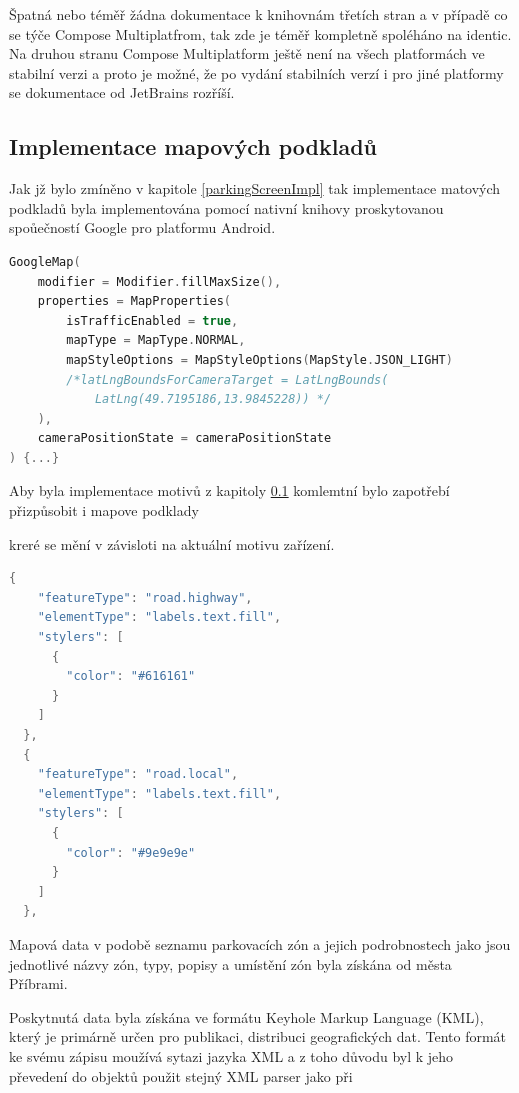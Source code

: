 Špatná nebo téměř žádna dokumentace k knihovnám třetích stran a v případě co se týče Compose Multiplatfrom, tak zde je téměř kompletně spoléháno na
identic. 
Na druhou stranu Compose Multiplatform ještě není na všech platformách ve stabilní verzi a proto je možné, že po vydání stabilních verzí i pro jiné
platformy se dokumentace od JetBrains rozříší.


\subsection{Implementace mapových podkladů}

Jak jž bylo zmíněno v kapitole \ref{parkingScreenImpl} tak implementace matových podkladů byla implementována pomocí nativní knihovy proskytovanou
spoůečností Google pro platformu Android. 

\begin{lstlisting}[caption={GoogleMap element}, label={lst:GoogleMapview}, language=kotlin]
  GoogleMap(
    modifier = Modifier.fillMaxSize(),
    properties = MapProperties(
        isTrafficEnabled = true,
        mapType = MapType.NORMAL,
        mapStyleOptions = MapStyleOptions(MapStyle.JSON_LIGHT)
        /*latLngBoundsForCameraTarget = LatLngBounds(
            LatLng(49.7195186,13.9845228)) */
    ),
    cameraPositionState = cameraPositionState
) {...}
\end{lstlisting}


Aby byla implementace motivů z kapitoly \ref{} komlemtní bylo zapotřebí přizpůsobit i mapove podklady

kreré se mění v závisloti na aktuální motivu zařízení.

\begin{lstlisting}[caption={Motiv mapy ve formátu JSON}, label={lst:MapStyle}, language=kotlin]
  {
    "featureType": "road.highway",
    "elementType": "labels.text.fill",
    "stylers": [
      {
        "color": "#616161"
      }
    ]
  },
  {
    "featureType": "road.local",
    "elementType": "labels.text.fill",
    "stylers": [
      {
        "color": "#9e9e9e"
      }
    ]
  },
\end{lstlisting}


Mapová data v podobě seznamu parkovacích zón a jejich podrobnostech jako jsou jednotlivé názvy zón, typy, popisy a umístění zón byla získána od
města Příbrami. 

Poskytnutá data byla získána ve formátu Keyhole Markup Language (KML), který je primárně určen pro publikaci, distribuci geografických dat.
Tento formát ke svému zápisu moužívá sytazi jazyka XML a z toho důvodu byl k jeho převedení do objektů použit stejný XML parser jako při 







